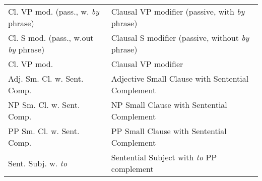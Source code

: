 \begin{tabular}{ll}
Cl. VP mod. (pass., w. {\it by} phrase)&Clausal VP modifier (passive, with
{\it by} phrase)\\
Cl. S mod. (pass., w.out {\it by} phrase)&Clausal S modifier (passive, without
{\it by} phrase) \\
Cl. VP mod.&Clausal VP modifier\\
Adj. Sm. Cl. w. Sent. Comp.&Adjective Small Clause with Sentential
Complement\\
NP Sm. Cl. w. Sent. Comp.&NP Small Clause with Sentential Complement\\
PP Sm. Cl. w. Sent. Comp.&PP Small Clause with Sentential Complement\\
Sent. Subj. w. {\it to} & Sentential Subject with {\it to} PP complement \\
\end{tabular}
\normalsize




